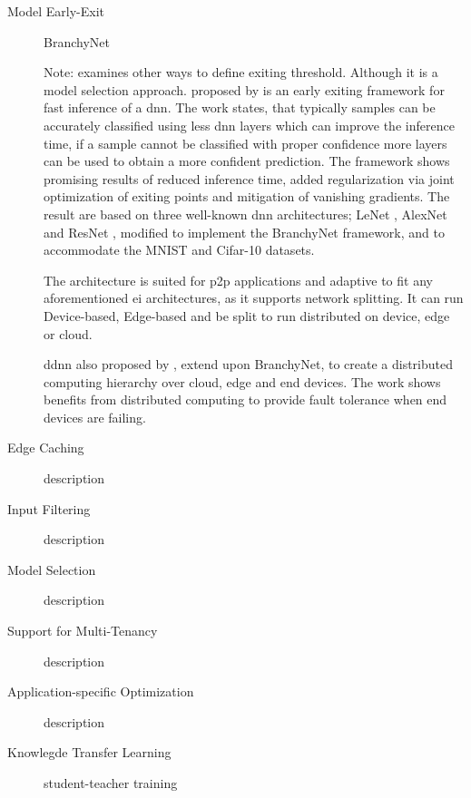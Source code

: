 \begin{description}
	\item[Model Early-Exit] BranchyNet
	
	Note: \cite{park_big/little_2015} examines other ways to define exiting threshold. Although it is a model selection approach.
	 \cite{teerapittayanon_branchynet:_2016} proposed by \citeauthor{teerapittayanon_branchynet:_2016} is an early exiting framework for fast inference of a \gls{dnn}. The work states, that typically samples can be accurately classified using less \gls{dnn} layers which can improve the inference time, if a sample cannot be classified with proper confidence more layers can be used to obtain a more confident prediction. The framework shows promising results of reduced inference time, added regularization via joint optimization of exiting points and mitigation of vanishing gradients. The result are based on three well-known \gls{dnn} architectures; LeNet \cite{lecun_lecun-98.pdf_1998}, AlexNet \cite{krizhevsky_imagenet_2017} and ResNet \cite{he_deep_2015}, modified to implement the BranchyNet framework, and to accommodate the MNIST \cite{lecun_mnist_2010} and Cifar-10 \cite{krizhevsky_cifar-10_nodate} datasets.  
	
	The architecture is suited for \gls{p2p} applications and adaptive to fit any aforementioned \gls{ei} architectures, as it supports network splitting. It can run Device-based, Edge-based and be split to run distributed on device, edge or cloud.
	
	\gls{ddnn} \cite{teerapittayanon_distributed_2017} also proposed by \citeauthor{teerapittayanon_distributed_2017}, extend upon BranchyNet,  to  create a distributed computing hierarchy over cloud, edge and end devices. The work shows benefits from distributed computing to provide fault tolerance when end devices are failing.
	
	\item[Edge Caching] description
	\item[Input Filtering] description
	\item[Model Selection] description
	\item[Support for Multi-Tenancy] description
	\item[Application-specific Optimization] description
	\item[Knowlegde Transfer Learning] student-teacher training 
\end{description}

